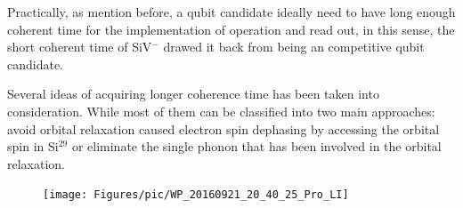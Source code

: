 Practically, as mention before, a qubit candidate ideally need to have long enough coherent time for the implementation of operation and read out, in this sense, the short coherent time of SiV$^{-}$ drawed it back from being an competitive qubit candidate. 

Several ideas of acquiring longer coherence time has been taken into consideration. While most of them can be classified into two main approaches: avoid orbital relaxation caused electron spin dephasing by accessing the orbital spin in Si$^{29}$ or eliminate the single phonon that has been involved in the orbital relaxation.







\FloatBarrier
\begin{figure}[h]
\centering
\texttt{[image: Figures/pic/WP\_20160921\_20\_40\_25\_Pro\_LI]}
\caption{}
\label{fig:wp20160921204025proli}
\end{figure}
\FloatBarrier

